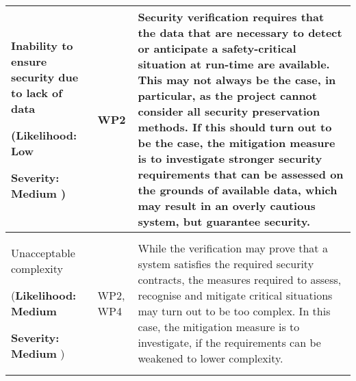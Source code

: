 \documentclass[a4paper,11pt]{article}
\begin{document}
\begin{longtable}{| p{3.5cm} | p{1.5cm} | p{11.8cm}  |}
%
\\\hline
Inability to ensure security due to lack of data
\par
({\textbf{Likelihood: Low }}
\par
{\textbf{Severity: Medium }})
& WP2 &
Security verification requires that the data that are necessary to detect or anticipate a safety-critical situation at run-time are available. This may not always be the case, in particular, as the project cannot consider all security preservation methods. If this should turn out to be the case, the mitigation measure is to investigate stronger security requirements that can be assessed on the grounds of available data, which may result in an overly cautious system, but guarantee security.
\\\hline
Unacceptable complexity
\par
({\textbf{Likelihood: Medium }}
\par
{\textbf{Severity: Medium }})
& WP2, WP4 &
While the verification may prove that a system satisfies the required security contracts, the measures required to assess, recognise and mitigate critical situations may turn out to be too complex. In this case, the mitigation measure is to investigate, if the requirements can be weakened to lower complexity.


\end{longtable}
\end{document}
